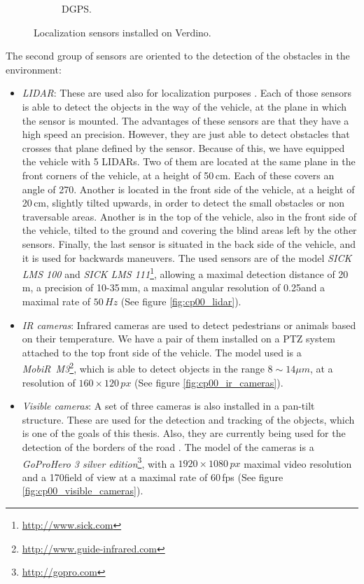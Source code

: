 \begin{figure}[h!]
\begin{subfigure}[b]{0.32\textwidth}
                \caption{\ac{DGPS}.}\label{fig:cp00_dgps}
        \end{subfigure}%
        \caption{Localization sensors installed on Verdino.}\label{fig:cp00_actuators}
\end{figure}

The second group of sensors are oriented to the detection of the obstacles in the environment:

\begin{itemize}
 \item \emph{\acf{LIDAR}}: These are used also for localization purposes \citep{Perea2013mcl}. Each of those sensors is able to detect the objects in the way of the vehicle, at the plane in which the sensor is mounted. The advantages of these sensors are that they have a high speed an precision. However, they are just able to detect obstacles that crosses that plane defined by the sensor. Because of this, we have equipped the vehicle with 5 \acp{LIDAR}. Two of them are located at the same plane in the front corners of the vehicle, at a height of 50\,cm. Each of these covers an angle of 270\textdegree. Another is located in the front side of the vehicle, at a height of 20\,cm, slightly tilted upwards, in order to detect the small obstacles or non traversable areas. Another is in the top of the vehicle, also in the front side of the vehicle, tilted to the ground and covering the blind areas left by the other sensors. Finally, the last sensor is situated in the back side of the vehicle, and it is used for backwards maneuvers. The used sensors are of the model \emph{SICK LMS 100} and \emph{SICK LMS 111}\footnote{\url{http://www.sick.com}}, allowing a maximal detection distance of 20\,m, a precision of 10-35\,mm, a maximal angular resolution of 0.25\textdegree and a maximal rate of $50\,Hz$ (See figure \ref{fig:cp00_lidar}).
 \item \emph{IR cameras}: Infrared cameras are used to detect pedestrians or animals based on their temperature. We have a pair of them installed on a \ac{PTZ} system attached to the top front side of the vehicle. The model used is a \emph{MobiR\textregistered~M3}\footnote{\url{http://www.guide-infrared.com}}, which is able to detect objects in the range $8\sim14\mu m$, at a resolution of $160 \times 120\,px$ (See figure \ref{fig:cp00_ir_cameras}).
 \item \emph{Visible cameras}: A set of three cameras is also installed in a pan-tilt structure. These are used for the detection and tracking of the objects, which is one of the goals of this thesis. Also, they are currently being used for the detection of the borders of the road \citep{arnay2009applying}. The model of the cameras is a \emph{GoPro\textregistered Hero 3 silver edition}\footnote{\url{http://gopro.com}}, with a $1920 \times 1080 \, px$ maximal video resolution and a 170\textdegree field of view at a maximal rate of 60\,fps (See figure \ref{fig:cp00_visible_cameras}).
\end{itemize}

